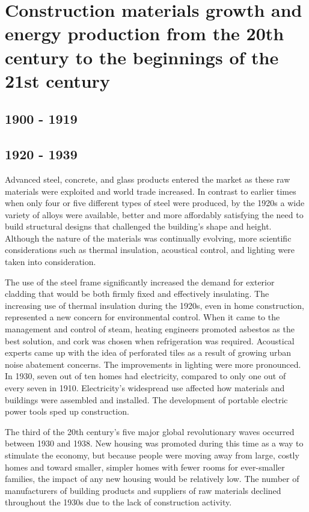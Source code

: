 \section[Construction materials growth and energy production from the 20th century to the beginnings of the 21st century]{Construction materials growth and energy production from the 20th century to the beginnings of the 21st century}
\label{sec:construction_materials_growth_and_energy_production_in_the_20th_century}

\subsection{1900 - 1919}
\label{sec:1900-1919}

\subsection{1920 - 1939}
\label{sec:1900-1919}

Advanced steel, concrete, and glass products entered the market as these raw materials were exploited and world trade increased. In contrast to earlier times when only four or five different types of steel were produced,\autocite{jester2014twentieth} by the 1920s a wide variety of alloys were available, better and more affordably satisfying the need to build structural designs that challenged the building's shape and height. Although the nature of the materials was continually evolving, more scientific considerations such as thermal insulation, acoustical control, and lighting were taken into consideration.

The use of the steel frame significantly increased the demand for exterior cladding that would be both firmly fixed and effectively insulating. The increasing use of thermal insulation during the 1920s, even in home construction, represented a new concern for environmental control. When it came to the management and control of steam, heating engineers promoted asbestos as the best solution, and cork was chosen when refrigeration was required. Acoustical experts came up with the idea of perforated tiles as a result of growing urban noise abatement concerns. The improvements in lighting were more pronounced. In 1930, seven out of ten homes had electricity, compared to only one out of every seven in 1910. 
Electricity's widespread use affected how materials and buildings were assembled and installed. The development of portable electric power tools sped up construction.

The third of the 20th century's five major global revolutionary waves occurred between 1930 and 1938. New housing was promoted during this time as a way to stimulate the economy, but because people were moving away from large, costly homes and toward smaller, simpler homes with fewer rooms for ever-smaller families, the impact of any new housing would be relatively low. The number of manufacturers of building products and suppliers of raw materials declined throughout the 1930s due to the lack of construction activity.

